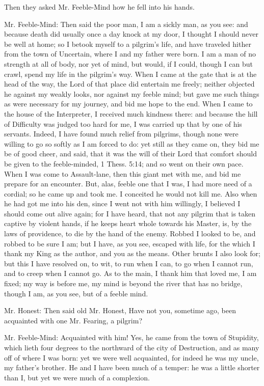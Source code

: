Then they asked Mr. Feeble-Mind how he fell into his hands.

Mr. Feeble-Mind: Then said the poor man, I am a sickly man, as you see: and because death did usually once a day knock at my door, I thought I should never be well at home; so I betook myself to a pilgrim's life, and have traveled hither from the town of Uncertain, where I and my father were born. I am a man of no strength at all of body, nor yet of mind, but would, if I could, though I can but crawl, spend my life in the pilgrim's way. When I came at the gate that is at the head of the way, the Lord of that place did entertain me freely; neither objected he against my weakly looks, nor against my feeble mind; but gave me such things as were necessary for my journey, and bid me hope to the end. When I came to the house of the Interpreter, I received much kindness there: and because the hill of Difficulty was judged too hard for me, I was carried up that by one of his servants. Indeed, I have found much relief from pilgrims, though none were willing to go so softly as I am forced to do: yet still as they came on, they bid me be of good cheer, and said, that it was the will of their Lord that comfort should be given to the feeble-minded, 1 Thess. 5:14; and so went on their own pace. When I was come to Assault-lane, then this giant met with me, and bid me prepare for an encounter. But, alas, feeble one that I was, I had more need of a cordial; so he came up and took me. I conceited he would not kill me. Also when he had got me into his den, since I went not with him willingly, I believed I should come out alive again; for I have heard, that not any pilgrim that is taken captive by violent hands, if he keeps heart whole towards his Master, is, by the laws of providence, to die by the hand of the enemy. Robbed I looked to be, and robbed to be sure I am; but I have, as you see, escaped with life, for the which I thank my King as the author, and you as the means. Other brunts I also look for; but this I have resolved on, to wit, to run when I can, to go when I cannot run, and to creep when I cannot go. As to the main, I thank him that loved me, I am fixed; my way is before me, my mind is beyond the river that has no bridge, though I am, as you see, but of a feeble mind.

Mr. Honest: Then said old Mr. Honest, Have not you, sometime ago, been acquainted with one Mr. Fearing, a pilgrim?

Mr. Feeble-Mind: Acquainted with him! Yes, he came from the town of Stupidity, which lieth four degrees to the northward of the city of Destruction, and as many off of where I was born: yet we were well acquainted, for indeed he was my uncle, my father's brother. He and I have been much of a temper: he was a little shorter than I, but yet we were much of a complexion.

